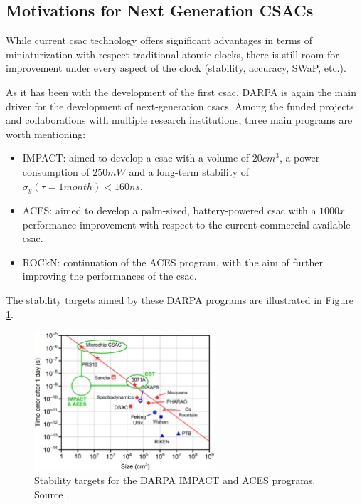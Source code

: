 \subsection{Motivations for Next Generation CSACs}
\label{subsec:motivations}

While current \acrshort{csac} technology offers significant advantages in terms of miniaturization with respect traditional atomic clocks, there is still room for improvement under every aspect of the clock (stability, accuracy, SWaP, etc.).

As it has been with the development of the first \acrshort{csac}, DARPA is again the main driver for the development of next-generation \acrshort{csacs}.
Among the funded projects and collaborations with multiple research institutions, three main programs are worth mentioning:

\begin{itemize}
    \item IMPACT: aimed to develop a \acrshort{csac} with a volume of $20cm^3$, a power consumption of $250mW$ and a long-term stability of $\sigma_y(\tau=1month) < 160ns$.
    \item ACES: aimed to develop a palm-sized, battery-powered \acrshort{csac} with a $1000x$ performance improvement with respect to the current commercial available \acrshort{csac}.
    \item ROCkN: continuation of the ACES program, with the aim of further improving the performances of the \acrshort{csac}.
\end{itemize}

The stability targets aimed by these DARPA programs are illustrated in Figure \ref{fig:DARPA-stability-target}.

\begin{figure}[H]
    \centering
    \includegraphics[width=0.6\textwidth, max width=\linewidth]{img/DARPA-stability-target.jpg}
    \caption{Stability targets for the DARPA IMPACT and ACES programs. Source \cite{Marlow-Scherer}.}
    \label{fig:DARPA-stability-target}
\end{figure}

